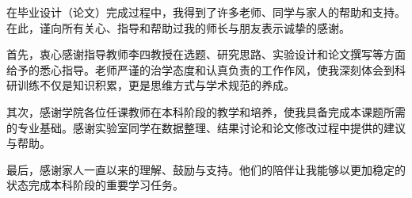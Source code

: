 在毕业设计（论文）完成过程中，我得到了许多老师、同学与家人的帮助和支持。在此，谨向所有关心、指导和帮助过我的师长与朋友表示诚挚的感谢。

首先，衷心感谢指导教师李四教授在选题、研究思路、实验设计和论文撰写等方面给予的悉心指导。老师严谨的治学态度和认真负责的工作作风，使我深刻体会到科研训练不仅是知识积累，更是思维方式与学术规范的养成。

其次，感谢学院各位任课教师在本科阶段的教学和培养，使我具备完成本课题所需的专业基础。感谢实验室同学在数据整理、结果讨论和论文修改过程中提供的建议与帮助。

最后，感谢家人一直以来的理解、鼓励与支持。他们的陪伴让我能够以更加稳定的状态完成本科阶段的重要学习任务。
